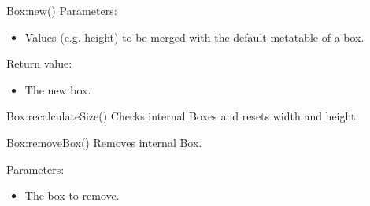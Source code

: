 \begin{luacommand}{{Box:new}()}
Parameters:
\begin{itemize}
	\item[]  \subitem Values (e.g. height) to be merged with the default-metatable of a box.
\end{itemize}


Return value:
\begin{itemize} \item[] The new box. \end{itemize}


\end{luacommand}\begin{luacommand}{{Box:recalculateSize}()}
Checks internal Boxes and resets width and height.



\end{luacommand}\begin{luacommand}{{Box:removeBox}()}
Removes internal Box.

Parameters:
\begin{itemize}
	\item[]  \subitem The box to remove.
\end{itemize}



\end{luacommand}

